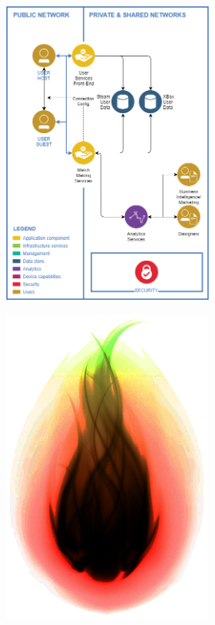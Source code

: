 \documentclass[12pt]{report}
\begin{document}
\begin{figure}[h]
    \centering
    \includegraphics[width=0.6\textwidth]{network}
\end{figure}

\cleardoublepage

\thispagestyle{empty}

\vspace*{\fill}

\begin{figure}[h]
    \centering
    \includegraphics[width=0.6\textwidth]{fireball}
\end{figure}

\vfill
\end{document}
